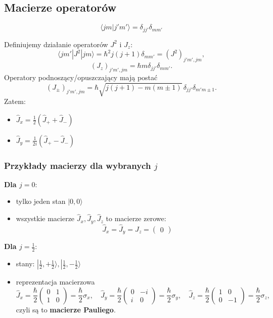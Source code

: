 \subsection{Macierze operatorów}
$$
\langle j m | j' m' \rangle = \delta_{jj'} \delta_{mm'}
$$

Definiujemy działanie operatorów $J^2$ i $J_z$:
$$
\langle j m' | J^2 | j m \rangle = \hbar^2 j(j+1) \delta_{mm'} = (J^2)_{j'm', jm},
$$
$$
(J_z)_{j'm', jm} = \hbar m \delta_{jj'} \delta_{mm'}.
$$
Operatory podnoszący/opuszczający mają postać
$$
(J_\pm)_{j'm', jm} = \hbar \sqrt{j(j+1) - m(m \pm 1)} \, \delta_{jj'} \delta_{m'm\pm 1}.
$$
Zatem:
\begin{itemize}
\item $\hat{J}_x = \frac{1}{2}(\hat{J}_+ + \hat{J}_-)$
\item $\hat{J}_y = \frac{1}{2i}(\hat{J}_+ - \hat{J}_-)$
\end{itemize}

\subsubsection*{Przykłady macierzy dla wybranych $j$}
\textbf{Dla $j = 0$}:
\begin{itemize}
\item tylko jeden stan $|0, 0\rangle$
\item wszystkie macierze $\hat{J}_x, \hat{J}_y, \hat{J}_z$ to macierze zerowe:
  $$
  \hat{J}_x = \hat{J}_y = \hat{J}_z = \begin{pmatrix} 0 \end{pmatrix}
  $$
\end{itemize}

\textbf{Dla $j = \frac{1}{2}$}:
\begin{itemize}
\item stany: $| \tfrac{1}{2}, +\tfrac{1}{2} \rangle, | \tfrac{1}{2}, -\tfrac{1}{2} \rangle$
\item reprezentacja macierzowa
$$
\hat{J}_x = \frac{\hbar}{2}
\begin{pmatrix}
0 & 1 \\
1 & 0
\end{pmatrix}
= \frac{\hbar}{2} \sigma_x,
\quad
\hat{J}_y = \frac{\hbar}{2}
\begin{pmatrix}
0 & -i \\
i & 0
\end{pmatrix}
= \frac{\hbar}{2} \sigma_y,
\quad
\hat{J}_z = \frac{\hbar}{2}
\begin{pmatrix}
1 & 0 \\
0 & -1
\end{pmatrix}
= \frac{\hbar}{2} \sigma_z,
$$
czyli są to \textbf{macierze Pauliego}.
\end{itemize}


